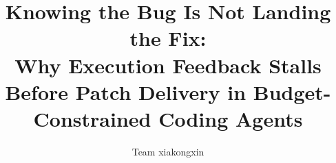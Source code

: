 \documentclass[10pt,a4paper]{article}
\title{Knowing the Bug Is Not Landing the Fix:\\Why Execution Feedback Stalls Before Patch Delivery in Budget-Constrained Coding Agents}
\author{Team xiakongxin}
\date{}
\begin{document}
\maketitle







{\small


}
\end{document}
